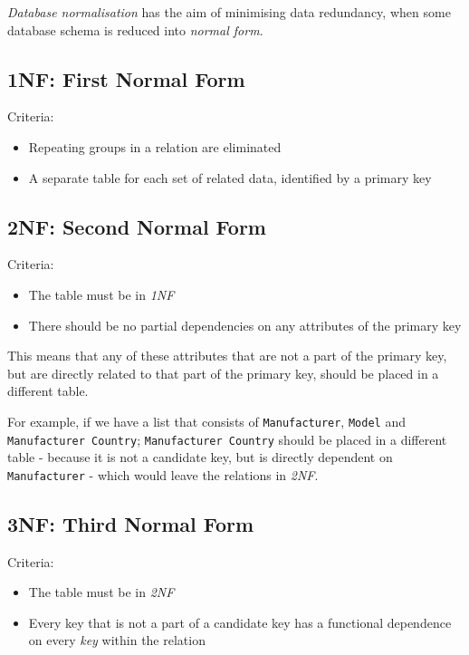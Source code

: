 \documentclass{article}
\begin{document}
\textit{Database normalisation} has the aim of minimising data redundancy, when some database schema is reduced into \textit{normal form}.

\subsection{1NF: First Normal Form}

Criteria:

\begin{itemize}
  \item Repeating groups in a relation are eliminated
  \item A separate table for each set of related data, identified by a primary key
\end{itemize}

\subsection{2NF: Second Normal Form}

Criteria:

\begin{itemize}
\item
  The table must be in \textit{1NF}
\item
  There should be no partial dependencies on any attributes of the primary key
\end{itemize}

This means that any of these attributes that are not a part of the primary key, but are directly related to that part of the primary key, should be placed in a different table.

For example, if we have a list that consists of \texttt{Manufacturer}, \texttt{Model} and \texttt{Manufacturer Country}; \texttt{Manufacturer Country} should be placed in a different table - because it is not a candidate key, but is directly dependent on \texttt{Manufacturer} - which would leave the relations in \textit{2NF}.

\subsection{3NF: Third Normal Form}

Criteria:

\begin{itemize}
\item
  The table must be in \textit{2NF}
\item
  Every key that is not a part of a candidate key has a functional dependence on every \textit{key} within the relation
\end{itemize}
\end{document}

